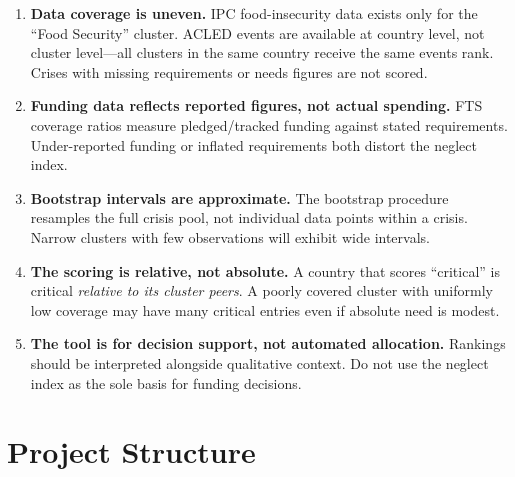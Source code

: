 \documentclass[11pt,a4paper]{article}
\begin{document}
\begin{enumerate}
  \item \textbf{Data coverage is uneven.}
        IPC food-insecurity data exists only for the ``Food Security'' cluster.
        ACLED events are available at country level, not cluster level---all clusters
        in the same country receive the same events rank.
        Crises with missing requirements or needs figures are not scored.

  \item \textbf{Funding data reflects reported figures, not actual spending.}
        FTS coverage ratios measure pledged/tracked funding against stated requirements.
        Under-reported funding or inflated requirements both distort the neglect index.

  \item \textbf{Bootstrap intervals are approximate.}
        The bootstrap procedure resamples the full crisis pool, not individual data
        points within a crisis.  Narrow clusters with few observations will exhibit
        wide intervals.

  \item \textbf{The scoring is relative, not absolute.}
        A country that scores ``critical'' is critical \emph{relative to its cluster peers}.
        A poorly covered cluster with uniformly low coverage may have many critical entries
        even if absolute need is modest.

  \item \textbf{The tool is for decision support, not automated allocation.}
        Rankings should be interpreted alongside qualitative context.
        Do not use the neglect index as the sole basis for funding decisions.
\end{enumerate}

\section{Project Structure}
\end{document}
